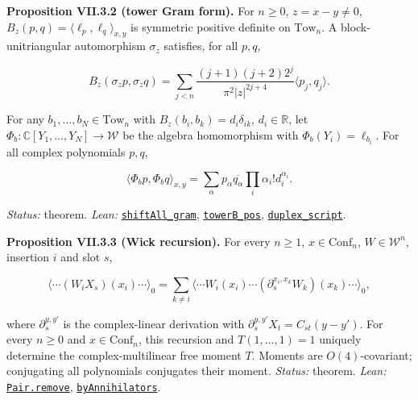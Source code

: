 \documentclass[
  letterpaper,
  11pt]{article}
\begin{document}
\textbf{Proposition VII.3.2 (tower Gram form).} For \(n\ge0\),
\(z=x-y\ne0\), \(B_z(p,q)=\langle\ell_p,\ell_q\rangle_{x,y}\) is
symmetric positive definite on \(\mathrm{Tow}_n\). A block-unitriangular
automorphism \(\sigma_z\) satisfies, for all \(p,q\),

\[B_z(\sigma_zp,\sigma_zq)=\sum_{j<n}\frac{(j+1)(j+2)2^j}{\pi^2|z|^{2j+4}}\langle p_j,q_j\rangle.\]

For any \(b_1,\ldots,b_N\in\mathrm{Tow}_n\) with
\(B_z(b_i,b_k)=d_i\delta_{ik}\), \(d_i\in\mathbb R\), let
\(\Phi_b:\mathbb C[Y_1,\ldots,Y_N]\to\mathcal W\) be the algebra
homomorphism with \(\Phi_b(Y_i)=\ell_{b_i}\). For all complex
polynomials \(p,q\),

\[\langle\Phi_bp,\Phi_bq\rangle_{x,y}=\sum_\alpha p_\alpha\overline{q_\alpha}\prod_i\alpha_i!d_i^{\alpha_i}.\]

\emph{Status:} theorem. \emph{Lean:}
\href{https://github.com/yang-mills-group/OpenAI-YM-20261028/blob/3456e5e75cf8d4cd558955a5c7638fba2d68f464/YM/Extra/FREE_DETECTOR_ALGEBRA/PositiveLeg.lean\#L126-L133}{\texttt{shiftAll\_gram}},
\href{https://github.com/yang-mills-group/OpenAI-YM-20261028/blob/3456e5e75cf8d4cd558955a5c7638fba2d68f464/YM/Extra/FREE_DETECTOR_ALGEBRA/PositiveLeg.lean\#L150-L154}{\texttt{towerB\_pos}},
\href{https://github.com/yang-mills-group/OpenAI-YM-20261028/blob/3456e5e75cf8d4cd558955a5c7638fba2d68f464/YM/Extra/FREE_DETECTOR_ALGEBRA/PowerGram.lean\#L100-L116}{\texttt{duplex\_script}}.

\textbf{Proposition VII.3.3 (Wick recursion).} For every \(n\ge1\),
\(x\in\mathrm{Conf}_n\), \(W\in\mathcal W^n\), insertion \(i\) and slot
\(s\),

\[\langle\cdots(W_iX_s)(x_i)\cdots\rangle_0=\sum_{k\ne i}\langle\cdots W_i(x_i)\cdots(\partial_s^{x_i,x_k}W_k)(x_k)\cdots\rangle_0,\]

where \(\partial_s^{y,y'}\) is the complex-linear derivation with
\(\partial_s^{y,y'}X_t=C_{st}(y-y')\). For every \(n\ge0\) and
\(x\in\mathrm{Conf}_n\), this recursion and \(T(1,\ldots,1)=1\) uniquely
determine the complex-multilinear free moment \(T\). Moments are
\(O(4)\)-covariant; conjugating all polynomials conjugates their moment.
\emph{Status:} theorem. \emph{Lean:}
\href{https://github.com/yang-mills-group/OpenAI-YM-20261028/blob/3456e5e75cf8d4cd558955a5c7638fba2d68f464/YM/Extra/FREE_DETECTOR_ALGEBRA/Removal.lean\#L91-L108}{\texttt{Pair.remove}},
\href{https://github.com/yang-mills-group/OpenAI-YM-20261028/blob/3456e5e75cf8d4cd558955a5c7638fba2d68f464/YM/Extra/FREE_DETECTOR_ALGEBRA/Gaussian.lean\#L24-L62}{\texttt{byAnnihilators}}.
\end{document}
